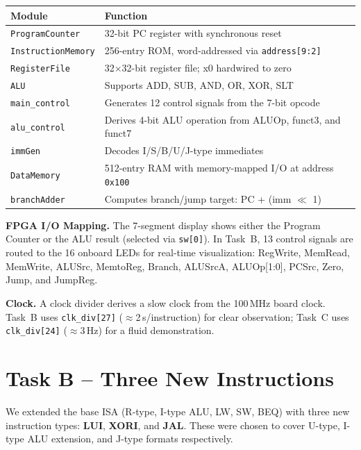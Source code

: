 \documentclass[11pt,a4paper]{article}
\begin{document}
\begin{table}[H]
\centering
\small
\begin{tabularx}{\textwidth}{lX}
\toprule
\textbf{Module} & \textbf{Function} \\
\midrule
\texttt{ProgramCounter} & 32-bit PC register with synchronous reset \\
\texttt{InstructionMemory} & 256-entry ROM, word-addressed via \texttt{address[9:2]} \\
\texttt{RegisterFile} & 32$\times$32-bit register file; x0 hardwired to zero \\
\texttt{ALU} & Supports ADD, SUB, AND, OR, XOR, SLT \\
\texttt{main\_control} & Generates 12 control signals from the 7-bit opcode \\
\texttt{alu\_control} & Derives 4-bit ALU operation from ALUOp, funct3, and funct7 \\
\texttt{immGen} & Decodes I/S/B/U/J-type immediates \\
\texttt{DataMemory} & 512-entry RAM with memory-mapped I/O at address \texttt{0x100} \\
\texttt{branchAdder} & Computes branch/jump target: PC + (imm $\ll$ 1) \\
\bottomrule
\end{tabularx}
\end{table}

\textbf{FPGA I/O Mapping.} The 7-segment display shows either the Program Counter or the ALU result (selected via \texttt{sw[0]}). In Task~B, 13 control signals are routed to the 16 onboard LEDs for real-time visualization: RegWrite, MemRead, MemWrite, ALUSrc, MemtoReg, Branch, ALUSrcA, ALUOp[1:0], PCSrc, Zero, Jump, and JumpReg.

\textbf{Clock.} A clock divider derives a slow clock from the 100\,MHz board clock. Task~B uses \texttt{clk\_div[27]} ($\approx$2\,s/instruction) for clear observation; Task~C uses \texttt{clk\_div[24]} ($\approx$3\,Hz) for a fluid demonstration.

\section{Task B -- Three New Instructions}

We extended the base ISA (R-type, I-type ALU, LW, SW, BEQ) with three new instruction types: \textbf{LUI}, \textbf{XORI}, and \textbf{JAL}. These were chosen to cover U-type, I-type ALU extension, and J-type formats respectively.
\end{document}
